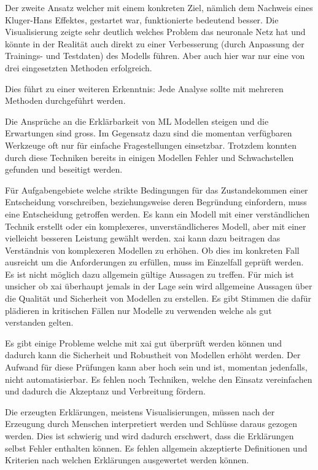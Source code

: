 \documentclass[
  12pt, %
  a4paper, %
  oneside, %
  openany, 
  numbers=noenddot, %
  BCOR=5mm, %
  parskip=half*, %
  thesis, %
]{bfhbook}
\begin{document}
Der zweite Ansatz welcher mit einem konkreten Ziel, nämlich dem Nachweis eines Kluger-Hans Effektes, gestartet war, funktionierte bedeutend besser. Die Visualisierung zeigte sehr deutlich welches Problem das neuronale Netz hat und könnte in der Realität auch direkt zu einer Verbesserung (durch Anpassung der Trainings- und Testdaten) des Modells führen. Aber auch hier war nur eine von drei eingesetzten Methoden erfolgreich. 

Dies führt zu einer weiteren Erkenntnis: Jede Analyse sollte mit mehreren Methoden durchgeführt werden. 

Die Ansprüche an die Erklärbarkeit von \Gls{ML} Modellen steigen und die Erwartungen sind gross. Im Gegensatz dazu sind die momentan verfügbaren Werkzeuge oft  nur für einfache Fragestellungen einsetzbar. Trotzdem konnten durch diese Techniken bereits in einigen Modellen Fehler und Schwachstellen gefunden und beseitigt werden. 

Für Aufgabengebiete welche strikte Bedingungen für das Zustandekommen einer Entscheidung vorschreiben, beziehungsweise deren Begründung einfordern, muss eine Entscheidung getroffen werden. Es kann ein Modell mit einer verständlichen Technik erstellt oder ein komplexeres, unverständlicheres Modell, aber mit einer vielleicht besseren Leistung gewählt werden. \Gls{xai} kann dazu beitragen das Verständnis von komplexeren Modellen zu erhöhen. Ob dies im konkreten Fall ausreicht um die Anforderungen zu erfüllen, muss im Einzelfall geprüft werden. Es ist nicht möglich dazu allgemein gültige Aussagen zu treffen. Für mich ist unsicher ob \Gls{xai} überhaupt jemals in der Lage sein wird allgemeine Aussagen über die Qualität und Sicherheit von Modellen zu erstellen. Es gibt Stimmen die dafür plädieren in kritischen Fällen nur Modelle zu verwenden welche als gut verstanden gelten.

Es gibt einige Probleme welche mit \Gls{xai} gut überprüft werden können und dadurch kann die Sicherheit und Robustheit von Modellen erhöht werden. Der Aufwand für diese Prüfungen kann aber hoch sein und ist, momentan jedenfalls, nicht automatisierbar. Es fehlen noch Techniken, welche den Einsatz vereinfachen und dadurch die Akzeptanz und Verbreitung fördern.

Die erzeugten Erklärungen, meistens Visualisierungen, müssen nach der Erzeugung durch Menschen interpretiert werden und Schlüsse daraus gezogen werden. Dies ist schwierig und wird dadurch erschwert, dass die Erklärungen selbst Fehler enthalten können. Es fehlen allgemein akzeptierte Definitionen und Kriterien nach welchen Erklärungen ausgewertet werden können.
\end{document}
